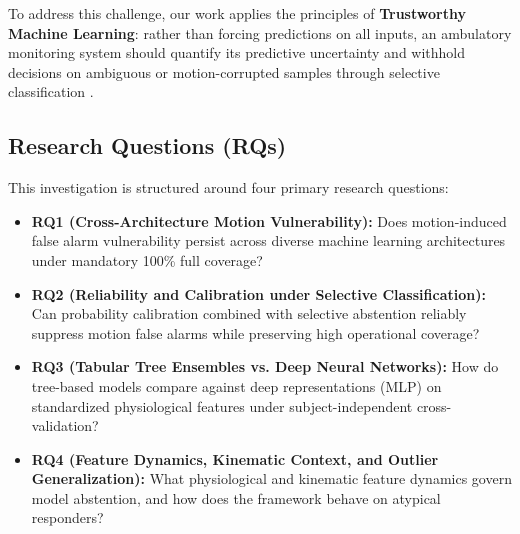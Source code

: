 \documentclass[conference]{IEEEtran}
\begin{document}
To address this challenge, our work applies the principles of \textbf{Trustworthy Machine Learning}: rather than forcing predictions on all inputs, an ambulatory monitoring system should quantify its predictive uncertainty and withhold decisions on ambiguous or motion-corrupted samples through selective classification \cite{chow1970optimum, cortes2016learning, geifman2017selective, geifman2019selectivenet, grandvalet2008support, hendrickx2024machine}.

\subsection{Research Questions (RQs)}
This investigation is structured around four primary research questions:
\begin{itemize}
    \item \textbf{RQ1 (Cross-Architecture Motion Vulnerability):} Does motion-induced false alarm vulnerability persist across diverse machine learning architectures under mandatory 100\% full coverage?
    \item \textbf{RQ2 (Reliability and Calibration under Selective Classification):} Can probability calibration combined with selective abstention reliably suppress motion false alarms while preserving high operational coverage?
    \item \textbf{RQ3 (Tabular Tree Ensembles vs. Deep Neural Networks):} How do tree-based models compare against deep representations (MLP) on standardized physiological features under subject-independent cross-validation?
    \item \textbf{RQ4 (Feature Dynamics, Kinematic Context, and Outlier Generalization):} What physiological and kinematic feature dynamics govern model abstention, and how does the framework behave on atypical responders?
\end{itemize}
\end{document}
